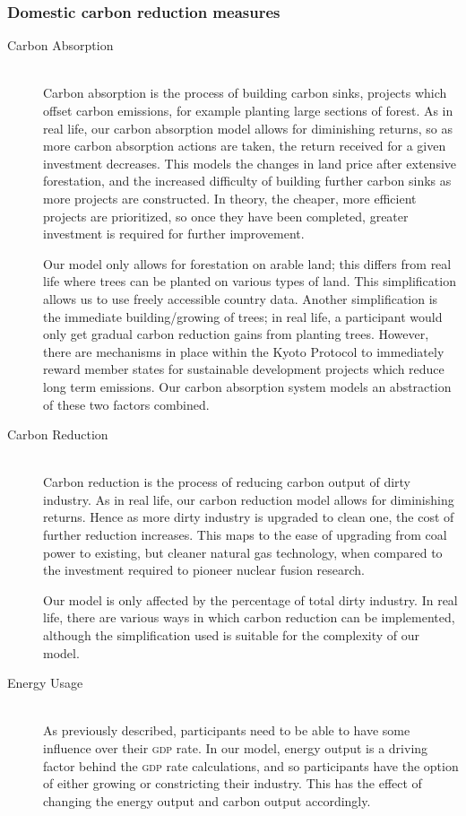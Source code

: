 \subsubsection{Domestic carbon reduction measures}
\begin{description}
	\item [Carbon Absorption] \hfill \\ Carbon absorption is the process of building carbon sinks, projects which offset carbon emissions, for example planting large sections of forest. As in real life, our carbon absorption model allows for diminishing returns, so as more carbon absorption actions are taken, the return received for a given investment decreases. This models the changes in land price after extensive forestation, and the increased difficulty of building further carbon sinks as more projects are constructed. In theory, the cheaper, more efficient projects are prioritized, so once they have been completed, greater investment is required for further improvement.

Our model only allows for forestation on arable land; this differs from real life where trees can be planted on various types of land. This simplification allows us to use freely accessible country data. Another simplification is the immediate building/growing of trees; in real life, a participant would only get gradual carbon reduction gains from planting trees. However, there are mechanisms in place within the Kyoto Protocol to immediately reward member states for sustainable development projects which reduce long term emissions. Our carbon absorption system models an abstraction of these two factors combined. 
	\item [Carbon Reduction] \hfill \\ Carbon reduction is the process of reducing carbon output of dirty industry. As in real life, our carbon reduction model allows for diminishing returns. Hence as more dirty industry is upgraded to clean one, the cost of further reduction increases. This maps to the ease of upgrading from coal power to existing, but cleaner natural gas technology, when compared to the investment required to pioneer nuclear fusion research.

Our model is only affected by the percentage of total dirty industry. In real life, there are various ways in which carbon reduction can be implemented, although the simplification used is suitable for the complexity of our model.
	\item [Energy Usage] \hfill \\ As previously described, participants need to be able to have some influence over their \textsc{gdp} rate. In our model, energy output is a driving factor behind the \textsc{gdp} rate calculations, and so participants have the option of either growing or constricting their industry. This has the effect of changing the energy output and carbon output accordingly.


\end{description}
